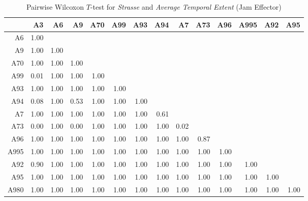 \begin{table}[ht]
	\tiny
	\centering
	\begin{tabular}{rrrrrrrrrrrrrr}
		\toprule
			 & A3 & A6 & A9 & A70 & A99 & A93 & A94 & A7 & A73 & A96 & A995 & A92 & A95 \\ 
		\midrule
		A6   & 1.00 &  &  &  &  &  &  &  &  &  &  &  &  \\ 
		A9   & 1.00 & 1.00 &  &  &  &  &  &  &  &  &  &  &  \\ 
		A70  & 1.00 & 1.00 & 1.00 &  &  &  &  &  &  &  &  &  &  \\ 
		A99  & 0.01 & 1.00 & 1.00 & 1.00 &  &  &  &  &  &  &  &  &  \\ 
		A93  & 1.00 & 1.00 & 1.00 & 1.00 & 1.00 &  &  &  &  &  &  &  &  \\ 
		A94  & 0.08 & 1.00 & 0.53 & 1.00 & 1.00 & 1.00 &  &  &  &  &  &  &  \\ 
		A7   & 1.00 & 1.00 & 1.00 & 1.00 & 1.00 & 1.00 & 0.61 &  &  &  &  &  &  \\ 
		A73  & 0.00 & 1.00 & 0.00 & 1.00 & 1.00 & 1.00 & 1.00 & 0.02 &  &  &  &  &  \\ 
		A96  & 1.00 & 1.00 & 1.00 & 1.00 & 1.00 & 1.00 & 1.00 & 1.00 & 0.87 &  &  &  &  \\ 
		A995 & 1.00 & 1.00 & 1.00 & 1.00 & 1.00 & 1.00 & 1.00 & 1.00 & 1.00 & 1.00 &  &  &  \\ 
		A92  & 0.90 & 1.00 & 1.00 & 1.00 & 1.00 & 1.00 & 1.00 & 1.00 & 1.00 & 1.00 & 1.00 &  &  \\ 
		A95  & 1.00 & 1.00 & 1.00 & 1.00 & 1.00 & 1.00 & 1.00 & 1.00 & 1.00 & 1.00 & 1.00 & 1.00 &  \\ 
		A980 & 1.00 & 1.00 & 1.00 & 1.00 & 1.00 & 1.00 & 1.00 & 1.00 & 1.00 & 1.00 & 1.00 & 1.00 & 1.00 \\ 
		\bottomrule
	  \end{tabular}
    \caption{Pairwise Wilcoxon $T$-test for \textit{Strasse} and \textit{Average Temporal Extent} (Jam Effector)}
    \label{tbl:wilcoxon_baysis_effector_Strasse_TAvg}
\end{table}
